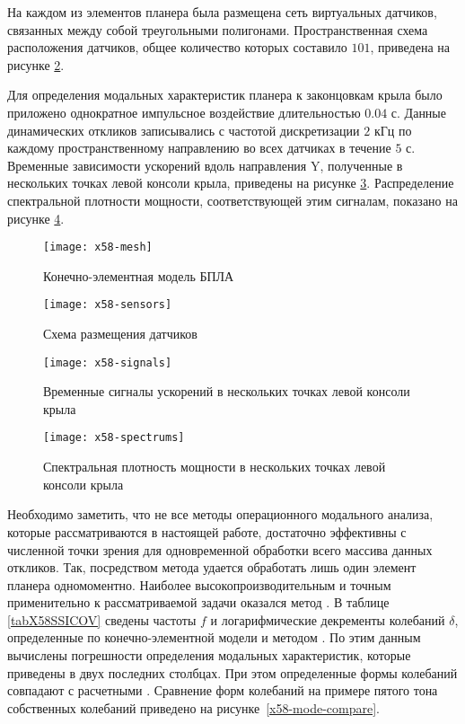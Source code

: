 На каждом из элементов планера была размещена сеть виртуальных датчиков, связанных между собой треугольными полигонами. Пространственная схема расположения датчиков, общее количество которых составило $ 101 $, приведена на рисунке \ref{x58-sensors}.

Для определения модальных характеристик планера к законцовкам крыла было приложено однократное импульсное воздействие длительностью $ 0.04 $ с. Данные динамических откликов записывались с частотой дискретизации $ 2 $ кГц по каждому пространственному направлению во всех датчиках в течение $ 5 $ с. Временные зависимости ускорений вдоль направления Y, полученные в нескольких точках левой консоли крыла, приведены на рисунке \ref{x58-signals}. Распределение спектральной плотности мощности, соответствующей этим сигналам, показано на рисунке \ref{x58-spectrums}.

\begin{figure}[!htb]
	\centerfloat
	\texttt{[image: x58-mesh]}
	\caption{Конечно-элементная модель БПЛА} \label{x58-mesh}
\end{figure}

\begin{figure}[!htb]
	\centerfloat
	\texttt{[image: x58-sensors]}
	\caption{Схема размещения датчиков} \label{x58-sensors}
\end{figure}

\begin{figure}[!htb]
	\centerfloat
	\texttt{[image: x58-signals]}
	\caption{Временные сигналы ускорений в нескольких точках левой консоли крыла} \label{x58-signals}
\end{figure}

\begin{figure}[!htb]
	\centerfloat
	\texttt{[image: x58-spectrums]}
	\caption{Спектральная плотность мощности в нескольких точках левой консоли крыла} \label{x58-spectrums}
\end{figure}

Необходимо заметить, что не все методы операционного модального анализа, которые рассматриваются в настоящей работе, достаточно эффективны с численной точки зрения для одновременной обработки всего массива данных откликов. Так, посредством метода  удается обработать лишь один элемент планера одномоментно. Наиболее высокопроизводительным и точным применительно к рассматриваемой задачи оказался метод . В таблице \ref{tabX58SSICOV} сведены частоты $ f $ и логарифмические декременты колебаний $ \delta $, определенные по конечно-элементной модели и методом . По этим данным вычислены погрешности определения модальных характеристик, которые приведены в двух последних столбцах. При этом определенные формы колебаний  совпадают с расчетными . Сравнение форм колебаний на примере пятого тона собственных колебаний приведено на рисунке~\ref{x58-mode-compare}. 

